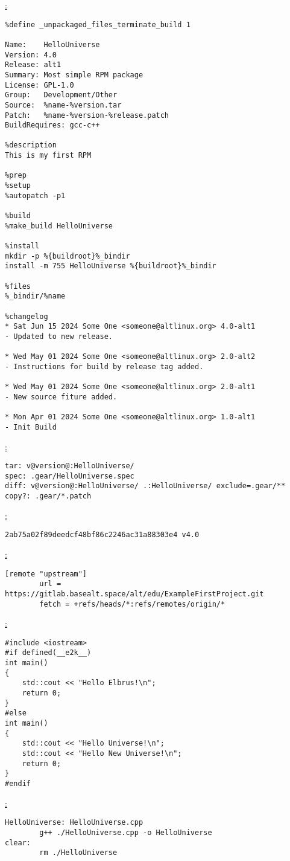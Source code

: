 \noindent\underline{:}
\begin{verbatim}
%define _unpackaged_files_terminate_build 1

Name:    HelloUniverse
Version: 4.0
Release: alt1
Summary: Most simple RPM package
License: GPL-1.0
Group:   Development/Other
Source:  %name-%version.tar
Patch:   %name-%version-%release.patch
BuildRequires: gcc-c++

%description
This is my first RPM

%prep
%setup
%autopatch -p1

%build
%make_build HelloUniverse

%install
mkdir -p %{buildroot}%_bindir
install -m 755 HelloUniverse %{buildroot}%_bindir

%files
%_bindir/%name

%changelog
* Sat Jun 15 2024 Some One <someone@altlinux.org> 4.0-alt1
- Updated to new release.

* Wed May 01 2024 Some One <someone@altlinux.org> 2.0-alt2
- Instructions for build by release tag added.

* Wed May 01 2024 Some One <someone@altlinux.org> 2.0-alt1
- New source fiture added.

* Mon Apr 01 2024 Some One <someone@altlinux.org> 1.0-alt1
- Init Build

\end{verbatim}


\noindent\underline{:}
\begin{verbatim}
tar: v@version@:HelloUniverse/
spec: .gear/HelloUniverse.spec
diff: v@version@:HelloUniverse/ .:HelloUniverse/ exclude=.gear/**
copy?: .gear/*.patch

\end{verbatim}

\noindent\underline{:}
\begin{verbatim}
2ab75a02f89deedcf48bf86c2246ac31a88303e4 v4.0

\end{verbatim}

\noindent\underline{:}
\begin{verbatim}
[remote "upstream"]
        url = https://gitlab.basealt.space/alt/edu/ExampleFirstProject.git
        fetch = +refs/heads/*:refs/remotes/origin/*

\end{verbatim}

\noindent\underline{:}
\begin{verbatim}
#include <iostream>
#if defined(__e2k__)
int main()
{
    std::cout << "Hello Elbrus!\n";
    return 0;
}
#else
int main()
{
    std::cout << "Hello Universe!\n";
    std::cout << "Hello New Universe!\n";
    return 0;
}
#endif

\end{verbatim}

\noindent\underline{:}
\begin{verbatim}
HelloUniverse: HelloUniverse.cpp
        g++ ./HelloUniverse.cpp -o HelloUniverse
clear:
        rm ./HelloUniverse
\end{verbatim}
